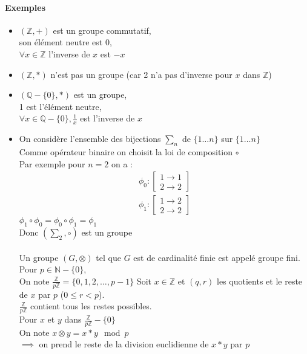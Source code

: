 \documentclass{report}
\newcommand{\Z}{\mathbb{Z}}
\newcommand{\N}{\mathbb{N}}
\newcommand{\Q}{\mathbb{Q}}
\begin{document}
	\paragraph{Exemples}
	\begin{itemize}
		\item $(\Z,+)$ est un groupe commutatif,\\
		son élément neutre est 0,\\
		$\forall x \in \Z$ l'inverse de $x$ est $-x$
		\item $(\Z,*)$ n'est pas un groupe (car 2 n'a pas d'inverse pour $x$ dans $\Z$)
		\item $(\Q-\{0\},*)$ est un groupe,\\
		1 est l'élément neutre,\\
		$\forall x \in \Q - \{0\}, \frac{1}{x}$ est l'inverse de $x$
		\item On considère l'ensemble des bijections $\sum_n$ de $\{1 \dots n\}$ sur $\{1 \dots n\}$\\
		Comme opérateur binaire on choisit la loi de composition $\circ$\\
		Par exemple pour $n=2$ on a :\\
		\[
		\begin{split}
			\phi_0 : 
			\begin{bmatrix}
			1 \to 1 \\ 2 \to 2
			\end{bmatrix}
			\\
			\phi_1 : 
			\begin{bmatrix}
			1 \to 2 \\ 2 \to 2
			\end{bmatrix}
		\end{split}
		\]
		$\phi_1 \circ \phi_0 = \phi_0 \circ \phi_1 = \phi_1$\\
		Donc $(\sum_2,\circ)$ est un groupe
		\paragraph{}
		Un groupe $(G, \otimes)$ tel que $G$ est de cardinalité finie est appelé groupe fini.\\
		Pour $p \in \N-\{0\}$,\\
		On note $\frac{\Z}{p\Z}=\{0,1,2,\dots,p-1\}$
		Soit $x \in \Z$ et $(q,r)$ les quotients et le reste de $x$ par $p$ ($0\leq r < p$).\\
		$\frac{\Z}{p\Z}$ contient tous les restes possibles.\\
		Pour $x$ et $y$ dans $\frac{\Z}{p\Z}-\{0\}$ \\
		On note $x \otimes y = x*y \mod p$\\
		$\implies$ on prend le reste de la division euclidienne de $x*y$ par $p$
	\end{itemize}
\end{document}

